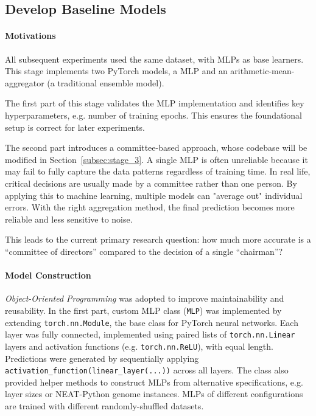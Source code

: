 \subsection{Develop Baseline Models}
\label{subsec:stage_1}
\label{subsec:stage_2}
\paragraph{Motivations}
All subsequent experiments used the same dataset, with MLPs as base learners. This stage implements two PyTorch models, a MLP and an arithmetic-mean-aggregator (a traditional ensemble model). 

The first part of this stage validates the MLP implementation and identifies key hyperparameters, e.g. number of training epochs. This ensures the foundational setup is correct for later experiments. 

The second part introduces a committee-based approach, whose codebase will be modified in Section~\ref{subsec:stage_3}. A single MLP is often unreliable because it may fail to fully capture the data patterns regardless of training time. In real life, critical decisions are usually made by a committee rather than one person. By applying this to machine learning, multiple models can "average out" individual errors. With the right aggregation method, the final prediction becomes more reliable and less sensitive to noise. 

This leads to the current primary research question: how much more accurate is a ``committee of directors'' compared to the decision of a single ``chairman''? 


\paragraph{Model Construction}
\textit{Object-Oriented Programming} was adopted to improve maintainability and reusability. In the first part, custom MLP class (\texttt{MLP}) was implemented by extending \texttt{torch.nn.Module}, the base class for PyTorch neural networks. Each layer was fully connected, implemented using paired lists of \texttt{torch.nn.Linear} layers and activation functions (e.g. \texttt{torch.nn.ReLU}), with equal length. Predictions were generated by sequentially applying \texttt{activation\_function(linear\_layer(...))} across all layers. The class also provided helper methods to construct MLPs from alternative specifications, e.g. layer sizes or NEAT-Python genome instances. MLPs of different configurations are trained with different randomly-shuffled datasets. 

